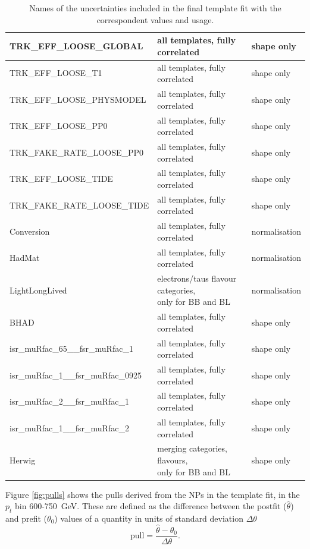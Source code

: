 \documentclass[10pt,a4paper]{book}
\begin{document}
\begin{table}[hbtp]
\begin{tabular}{|l|l|l|}
        TRK\_EFF\_LOOSE\_GLOBAL & all templates, fully correlated & shape only \\ \hline
        TRK\_EFF\_LOOSE\_T1 & all templates, fully correlated & shape only \\ \hline
        TRK\_EFF\_LOOSE\_PHYSMODEL & all templates, fully correlated & shape only \\ \hline
        TRK\_EFF\_LOOSE\_PP0 & all templates, fully correlated & shape only \\ \hline
        TRK\_FAKE\_RATE\_LOOSE\_PP0 & all templates, fully correlated & shape only \\ \hline
        TRK\_EFF\_LOOSE\_TIDE & all templates, fully correlated & shape only \\ \hline
        TRK\_FAKE\_RATE\_LOOSE\_TIDE & all templates, fully correlated & shape only \\ \hline
        \hline
        Conversion & all templates, fully correlated & normalisation \\ \hline
        HadMat & all templates, fully correlated & normalisation \\ \hline
        LightLongLived & \makecell{electrons/taus flavour categories,\\ only for BB and BL} & normalisation \\ \hline
        BHAD & all templates, fully correlated & shape only \\ \hline
        isr\_muRfac\_65\_\_fsr\_muRfac\_1 & all templates, fully correlated & shape only \\ \hline
        isr\_muRfac\_1\_\_fsr\_muRfac\_0925 & all templates, fully correlated & shape only \\ \hline
        isr\_muRfac\_2\_\_fsr\_muRfac\_1 & all templates, fully correlated & shape only \\ \hline
        isr\_muRfac\_1\_\_fsr\_muRfac\_2 & all templates, fully correlated & shape only \\ \hline
        Herwig & \makecell{merging categories, flavours,\\ only for BB and BL} & shape only \\ \hline
    \end{tabular}
    \caption{Names of the uncertainties included in the final template fit with the correspondent values and usage.}
    \label{tab:uncertainties}
\end{table}

Figure \ref{fig:pulls} shows the pulls derived from the NPs in the template fit, in the $p_t$ bin 600-750~GeV. These are defined as the difference between the postfit ($\hat{\theta}$) and prefit ($\theta_0$) values of a quantity in units of standard deviation $\Delta \theta$
\begin{equation}
    \text{pull} = \frac{\hat{\theta} - \theta_0}{\Delta \theta}.
\end{equation}
\end{document}
